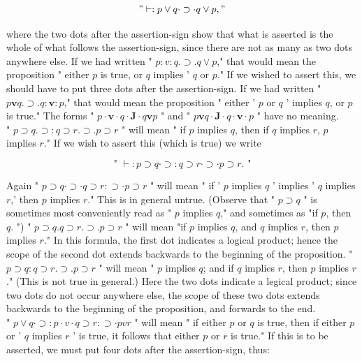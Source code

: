 \documentclass[10pt]{article}
\begin{document}
$$
" \vdash: p \vee q \cdot \supset \cdot q \vee p, "
$$

where the two dots after the assertion-sign show that what is asserted is the whole of what follows the assertion-sign, since there are not as many as two dots anywhere else. If we had written " $p: v: q . \supset . q \vee p$," that would mean the proposition " either $p$ is true, or $q$ implies ' $q$ or $p$." If we wished to assert this, we should have to put three dots after the assertion-sign. If we had written " $p \mathbf{v} q . \supset . q: \mathbf{v}: p$," that would mean the proposition " either ' $p$ or $q$ ' implies $q$, or $p$ is true." The forms " $p \cdot \mathbf{v} \cdot q \cdot \boldsymbol{J} \cdot q \mathbf{v} p$ " and " $p \mathbf{v} q \cdot \boldsymbol{J} \cdot q \cdot \mathbf{v} \cdot p$ " have no meaning.\\
" $p \supset q . \supset: q \supset r . \supset . p \supset r$ " will mean " if $p$ implies $q$, then if $q$ implies $r$, $p$ implies $r$." If we wish to assert this (which is true) we write

$$
\text { " } \vdash: p \supset q \cdot \supset: q \supset r \cdot \supset \cdot p \supset r . \text { " }
$$

Again " $p \supset q \cdot \supset \cdot q \supset r: \supset \cdot p \supset r$ " will mean " if ' $p$ implies $q$ ' implies ' $q$ implies $r$,' then $p$ implies $r$." This is in general untrue. (Observe that " $p \supset q$ " is sometimes most conveniently read as " $p$ implies $q$," and sometimes as "if $p$, then $q$. ") " $p \supset q . q \supset r . \supset . p \supset r$ " will mean "if $p$ implies $q$, and $q$ implies $r$, then $p$ implies $r$." In this formula, the first dot indicates a logical product; hence the scope of the second dot extends backwards to the beginning of the proposition. " $p \supset q: q \supset r . \supset . p \supset r$ " will mean " $p$ implies $q$; and if $q$ implies $r$, then $p$ implies $r$." (This is not true in general.) Here the two dots indicate a legical product; since two dots do not occur anywhere else, the scope of these two dots extends backwards to the beginning of the proposition, and forwards to the end.\\
" $p \vee q \cdot \supset: p \cdot v \cdot q \supset r: \supset \cdot p v r$ " will mean " if either $p$ or $q$ is true, then if either $p$ or ' $q$ implies $r$ ' is true, it follows that either $p$ or $r$ is true." If this is to be asserted, we must put four dots after the assertion-sign, thus:
\end{document}
